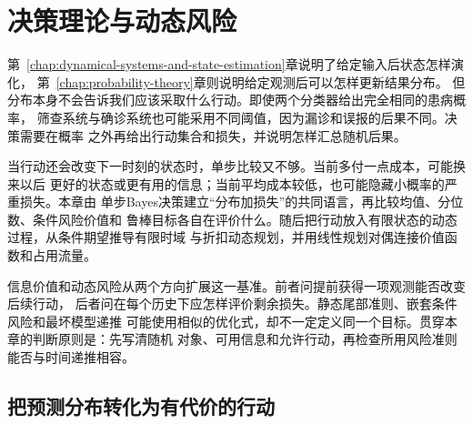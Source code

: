 \chapter{决策理论与动态风险}
\label{chap:decision-theory-and-dynamic-risk}

第~\ref{chap:dynamical-systems-and-state-estimation}章说明了给定输入后状态怎样演化，
第~\ref{chap:probability-theory}章则说明给定观测后可以怎样更新结果分布。
但分布本身不会告诉我们应该采取什么行动。即使两个分类器给出完全相同的患病概率，
筛查系统与确诊系统也可能采用不同阈值，因为漏诊和误报的后果不同。决策需要在概率
之外再给出行动集合和损失，并说明怎样汇总随机后果。

当行动还会改变下一时刻的状态时，单步比较又不够。当前多付一点成本，可能换来以后
更好的状态或更有用的信息；当前平均成本较低，也可能隐藏小概率的严重损失。本章由
单步Bayes决策建立“分布加损失”的共同语言，再比较均值、分位数、条件风险价值和
鲁棒目标各自在评价什么。随后把行动放入有限状态的动态过程，从条件期望推导有限时域
与折扣动态规划，并用线性规划对偶连接价值函数和占用流量。

信息价值和动态风险从两个方向扩展这一基准。前者问提前获得一项观测能否改变后续行动，
后者问在每个历史下应怎样评价剩余损失。静态尾部准则、嵌套条件风险和最坏模型递推
可能使用相似的优化式，却不一定定义同一个目标。贯穿本章的判断原则是：先写清随机
对象、可用信息和允许行动，再检查所用风险准则能否与时间递推相容。

\section{把预测分布转化为有代价的行动}
\label{sec:decision-bayes-rules}

